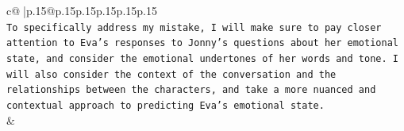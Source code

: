 \documentclass{article}
\begin{document}
{\begin{supertabular}{c@{$\;$}|p{.15\linewidth}@{}p{.15\linewidth}p{.15\linewidth}p{.15\linewidth}p{.15\linewidth}p{.15\linewidth}}
{{{\\ 
\texttt{To specifically address my mistake, I will make sure to pay closer attention to Eva's responses to Jonny's questions about her emotional state, and consider the emotional undertones of her words and tone. I will also consider the context of the conversation and the relationships between the characters, and take a more nuanced and contextual approach to predicting Eva's emotional state.} \\
            }
        }
    }
    & \\ \\

\end{supertabular}
}
\end{document}
